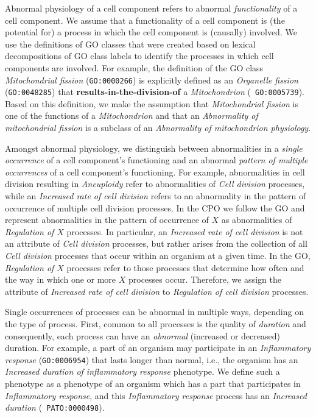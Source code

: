 \documentclass{bioinfo}
\renewcommand{\cite}{\citep}
\begin{document}
Abnormal physiology of a cell component refers to abnormal {\em
  functionality} of a cell component. We assume that a functionality
of a cell component is (the potential for) a process in which the cell
component is (causally) involved. We use the definitions of GO classes
that were created based on lexical decompositions of GO class labels
\cite{Mungall2010go, Bada2007a, Ogren2004} to identify the processes
in which cell components are involved. For example, the definition of
the GO class {\em Mitochondrial fission} ({\tt GO:0000266}) is
explicitly defined as an {\em Organelle fission} ({\tt GO:0048285})
that {\bf results-in-the-division-of} a {\em Mitochondrion} ({\tt
  GO:0005739}). Based on this definition, we make the assumption that
{\em Mitochondrial fission} is one of the functions of a {\em
  Mitochondrion} and that an {\em Abnormality of mitochondrial
  fission} is a subclass of an {\em Abnormality of mitochondrion
  physiology}.

Amongst abnormal physiology, we distinguish between abnormalities in a
{\em single occurrence} of a cell component's functioning and an
abnormal {\em pattern of multiple occurrences} of a cell component's
functioning. For example, abnormalities in cell division resulting in
{\em Aneuploidy} refer to abnormalities of {\em Cell division}
processes, while an {\em Increased rate of cell division} refers to an
abnormality in the pattern of occurrence of multiple cell division
processes. In the CPO we follow the GO and represent abnormalities in
the pattern of occurrence of $X$ as abnormalities of {\em Regulation
  of $X$} processes.  In particular, an {\em Increased rate of cell
  division} is not an attribute of {\em Cell division} processes, but
rather arises from the collection of all {\em Cell division} processes
that occur within an organism at a given time. In the
GO, {\em Regulation of $X$} processes refer to those processes that
determine how often and the way in which one or more $X$ processes
occur. Therefore, we assign the attribute of {\em Increased rate of
  cell division} to {\em Regulation of cell division} processes.

Single occurrences of processes can be abnormal in multiple ways,
depending on the type of process.
%
First, common to all processes is the quality of {\em duration} and
consequently, each process can have an {\em abnormal} (increased or
decreased) duration. For example, a part of an organism may
participate in an {\em Inflammatory response} ({\tt GO:0006954}) that
lasts longer than normal, i.e., the organism has an {\em Increased
  duration of inflammatory response} phenotype. We define such a
phenotype as a phenotype of an organism which has a part that
participates in {\em Inflammatory response}, and this {\em
  Inflammatory response} process has an {\em Increased duration} ({\tt
  PATO:0000498}).
\end{document}

